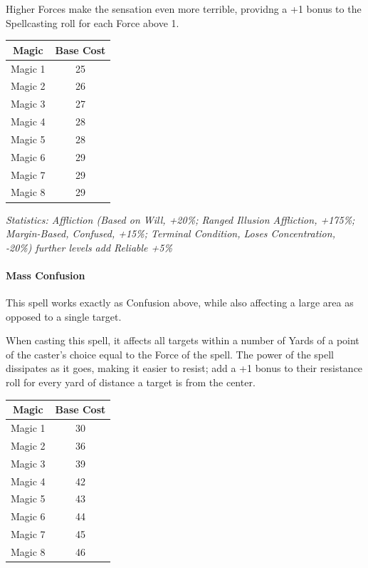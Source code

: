 \begin{multicols*}{3}
	Higher Forces make the sensation even more terrible, providng a +1 bonus to the Spellcasting roll for each Force above 1.
	
	\begin{center}
		\begin{tabular}{|c|c|}
			\hline
			Magic & Base Cost \\
			\hline
			\hline
			Magic 1 & 25 \\
			Magic 2 & 26 \\
			Magic 3 & 27 \\
			Magic 4 & 28 \\
			Magic 5 & 28 \\
			Magic 6 & 29 \\
			Magic 7 & 29 \\
			Magic 8 & 29 \\
			\hline
		\end{tabular}
	\end{center}

	\textcolor{OliveGreen}{\textit{Statistics: Affliction (Based on Will, +20\%; Ranged Illusion Affliction, +175\%; Margin-Based, Confused, +15\%; Terminal Condition, Loses Concentration, -20\%)  further levels add Reliable +5\%}}
	
	\paragraph{Mass Confusion}
	
	This spell works exactly as Confusion above, while also affecting a large area as opposed to a single target.
	
	When casting this spell, it affects all targets within a number of Yards of a point of the caster's choice equal to the Force of the spell. The power of the spell dissipates as it goes, making it easier to resist; add a +1 bonus to their resistance roll for every yard of distance a target is from the center.
	
	\begin{center}
		\begin{tabular}{|c|c|}
			\hline
			Magic & Base Cost \\
			\hline
			\hline
			Magic 1 & 30 \\
			Magic 2 & 36 \\
			Magic 3 & 39 \\
			Magic 4 & 42 \\
			Magic 5 & 43 \\
			Magic 6 & 44 \\
			Magic 7 & 45 \\
			Magic 8 & 46 \\
			\hline
		\end{tabular}
	\end{center}
	

\end{multicols*}
